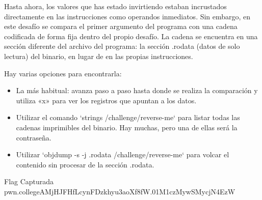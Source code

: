 Hasta ahora, los valores que has estado invirtiendo estaban incrustados directamente
en las instrucciones como operandos inmediatos. Sin embargo, en este desafío se
compara el primer argumento del programa con una cadena codificada de forma fija
dentro del propio desafío. La cadena se encuentra en una sección diferente del archivo
del programa: la sección .rodata (datos de solo lectura) del binario, en lugar de en las propias instrucciones.

Hay varias opciones para encontrarla:

\begin{itemize}
	\item La más habitual: avanza paso a paso hasta donde se realiza la comparación y utiliza «x» para ver los registros que apuntan a los datos.
	\item Utilizar el comando `strings /challenge/reverse-me` para listar todas las cadenas imprimibles del binario. Hay muchas, pero una de ellas será la contraseña.
	\item Utilizar `objdump -s -j .rodata /challenge/reverse-me` para volcar el contenido sin procesar de la sección .rodata.
\end{itemize}

\begin{flagbox}{Flag Capturada}
	pwn.college{AMjHJFHfLcynFDzkhyu3aoXf8fW.01M1czMywSMycjN4EzW}
\end{flagbox}
